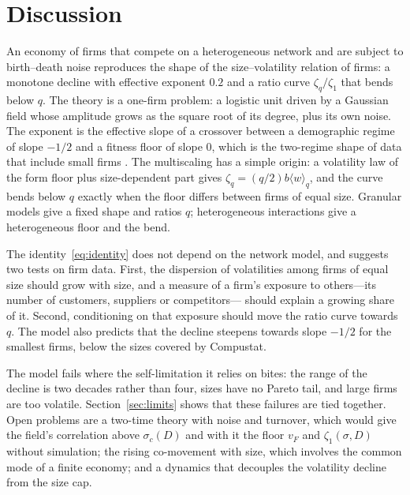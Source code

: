 \documentclass[pre,twocolumn,superscriptaddress,nofootinbib]{revtex4-2}
\begin{document}
\section{Discussion}
\label{sec:discussion}

An economy of firms that compete on a heterogeneous network and are subject to birth--death noise
reproduces the shape of the size--volatility relation of firms: a monotone decline with effective
exponent $0.2$ and a ratio curve $\zeta_q/\zeta_1$ that bends below $q$.  The theory is a one-firm problem:
a logistic unit driven by a Gaussian field whose amplitude grows as the square root of its degree,
plus its own noise.  The exponent is the effective slope of a crossover between a demographic regime
of slope $-1/2$ and a fitness floor of slope $0$, which is the two-regime shape of data that include
small firms \cite{fontanelli2025}.  The multiscaling has a simple origin: a volatility law of the form
floor plus size-dependent part gives $\zeta_q=(q/2)b\langle w\rangle_q$, and the curve bends below $q$ exactly
when the floor differs between firms of equal size.  Granular models give a fixed shape and ratios
$q$; heterogeneous interactions give a heterogeneous floor and the bend.

The identity~\eqref{eq:identity} does not depend on the network model, and suggests two tests on
firm data.  First, the dispersion of volatilities among firms of equal size should grow with size,
and a measure of a firm's exposure to others---its number of customers, suppliers or competitors---
should explain a growing share of it.  Second, conditioning on that exposure should move the ratio
curve towards $q$.  The model also predicts that the decline steepens towards slope $-1/2$ for the
smallest firms, below the sizes covered by Compustat.

The model fails where the self-limitation it relies on bites: the range of the decline is two decades
rather than four, sizes have no Pareto tail, and large firms are too volatile.  Section~\ref{sec:limits}
shows that these failures are tied together.  Open problems are a two-time theory with noise and
turnover, which would give the field's correlation above $\sigma_c(D)$ and with it the floor $v_F$ and
$\zeta_1(\sigma,D)$ without simulation; the rising co-movement with size, which involves the common mode
of a finite economy; and a dynamics that decouples the volatility decline from the size cap.


\end{document}
